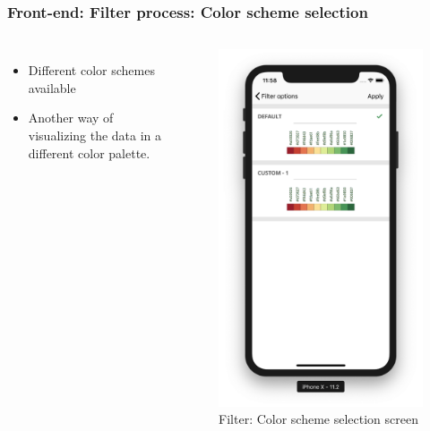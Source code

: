 \begin{frame}
\frametitle{Front-end: Filter process: Color scheme selection}
\begin{columns}

 \begin{itemize}
       \item Different color schemes available
       \item Another way of visualizing the data in a different color palette. 
   \end{itemize}

\begin{figure}
    \centering
    \begin{minipage}{.5\columnwidth}
    \includegraphics[width=\linewidth]{final/figures/color_scheme.png}
    \caption{Filter: Color scheme selection screen}
    \end{minipage}
\end{figure}
\end{columns}
\end{frame}


